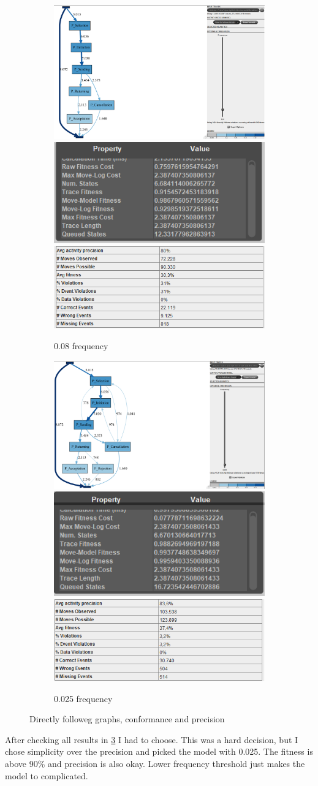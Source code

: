 \begin{figure}[h]
\centering
\begin{subfigure}{\textwidth}
  \centering
  \includegraphics[width=0.3\linewidth]{P_DirectlyFollowedFreq0-08.PNG}
  \includegraphics[width=0.3\linewidth]{P_Conformance0-08.PNG}
  \includegraphics[width=0.3\linewidth]{P_Precision0-08.PNG}
  \caption{0.08 frequency}
  \label{fig:P_0-08}
\end{subfigure}
\begin{subfigure}{\textwidth}
  \centering
  \includegraphics[width=0.3\linewidth]{P_DirectlyFollowedFreq0-025.PNG}
  \includegraphics[width=0.3\linewidth]{P_Conformance0-025.PNG}
  \includegraphics[width=0.3\linewidth]{P_Precision0-025.PNG}
  \caption{0.025 frequency}
  \label{fig:P_0-025}
\end{subfigure}
\caption{Directly followeg graphs, conformance and precision}
\label{fig:P_Direct2}
\end{figure}

After checking all results in \ref{fig:P_Direct2} I had to choose.
This was a hard decision, but I chose simplicity over the precision and picked the model with 0.025. The fitness is above 90\% and precision is also okay. Lower frequency threshold just makes the model to complicated.

